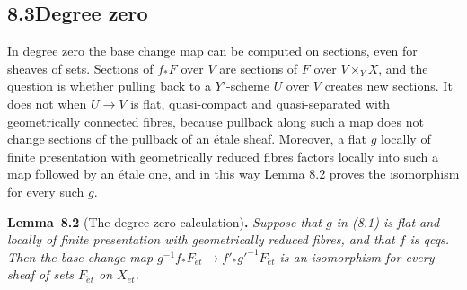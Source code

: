 \documentclass[11pt]{article}
\newenvironment{bpstatement}[2]{\par\addvspace{0.6\baselineskip}\noindent\textbf{#1}#2\textbf{.}\enspace\ignorespaces}
  {\par\addvspace{0.4\baselineskip}}
\newenvironment{bpstatementit}[2]{\begin{bpstatement}{#1}{#2}\itshape\ignorespaces}{\end{bpstatement}}
\begin{document}
\subsection*{\texorpdfstring{8.3\quad Degree zero}{8.3 Degree zero}}
\label{bp9}%
\label{bp10}%
In degree zero the base change map can be computed on sections, even for sheaves of sets. Sections of \(f_*F\) over \(V\) are sections of \(F\) over \(V\times_YX\), and the question is whether pulling back to a \(Y'\)-scheme \(U\) over \(V\) creates new sections. It does not when \(U\to V\) is flat, quasi-compact and quasi-separated with geometrically connected fibres, because pullback along such a map does not change sections of the pullback of an étale sheaf. Moreover, a flat \(g\) locally of finite presentation with geometrically reduced fibres factors locally into such a map followed by an étale one, and in this way Lemma \hyperref[bp11]{8.2} proves the isomorphism for every such \(g\).

\label{bp11}%
\begin{bpstatementit}{Lemma~8.2}{ (The degree-zero calculation)}
Suppose that \(g\) in (8.1) is flat and locally of finite presentation with geometrically reduced fibres, and that \(f\) is qcqs. Then the base change map \(g^{-1}f_*F_{\acute{e}t}\to f'_*g'^{-1}F_{\acute{e}t}\) is an isomorphism for every sheaf of sets \(F_{\acute{e}t}\) on \(X_{\acute{e}t}\).
\end{bpstatementit}
\end{document}
